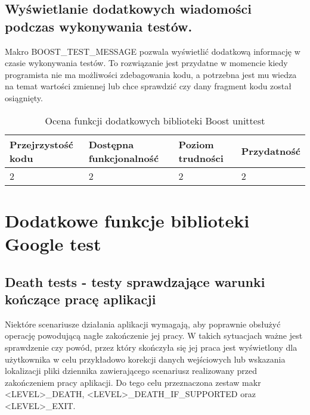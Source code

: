\documentclass[12pt,a4paper,notitlepage]{report}
\begin{document}
\section{Wyświetlanie dodatkowych wiadomości podczas wykonywania testów.}

Makro BOOST{\_}TEST{\_}MESSAGE pozwala wyświetlić dodatkową informację w czasie wykonywania testów. To rozwiązanie jest przydatne w momencie kiedy programista nie ma możliwości zdebagowania kodu, a potrzebna jest mu wiedza na temat wartości zmiennej lub chce sprawdzić czy dany fragment kodu został osiągnięty.

			


\begin{center}
			\begin{table}[!ht]
			\caption{Ocena funkcji dodatkowych biblioteki Boost unittest}
			\label{}
			\begin{tabular}[!hc]{|l|l|l|l|}
		\hline
		Przejrzystość kodu 	&	Dostępna funkcjonalność	&	Poziom trudności	&	Przydatność \\ \hline
		2					&	2						&	2					& 	2  			\\ \hline
			\end{tabular}
			\end{table} 
		\end{center}

\chapter{Dodatkowe funkcje biblioteki Google test}

\section{Death tests - testy sprawdzające warunki kończące pracę aplikacji}

Niektóre scenariusze działania aplikacji wymagają, aby poprawnie obsłużyć operację powodującą nagłe zakończenie jej pracy. W takich sytuacjach ważne jest sprawdzenie czy powód, przez który skończyła się jej praca jest wyświetlony dla użytkownika w celu przykładowo korekcji danych wejściowych lub wskazania lokalizacji pliki dziennika zawierającego scenariusz realizowany przed zakończeniem pracy aplikacji.
Do tego celu przeznaczona zestaw makr <LEVEL>{\_}DEATH, <LEVEL>{\_}DEATH{\_}IF{\_}SUPPORTED oraz <LEVEL>{\_}EXIT. 
\end{document}

